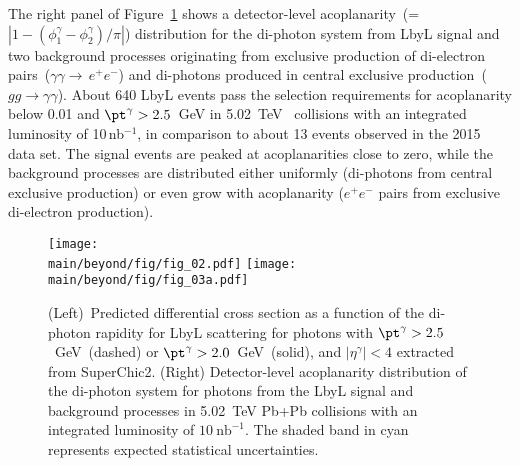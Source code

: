 \documentclass[../report.tex]{subfiles}
\providecommand{\main}{..}
\begin{document}
The right panel of Figure~\ref{fig:lbyl} shows a detector-level  acoplanarity~(=$|1-(\phi^\gamma_1-\phi^\gamma_2)/\pi|$) distribution for the di-photon system from LbyL signal and two background processes originating from exclusive production of di-electron pairs~($\gamma\gamma\rightarrow\,e^+e^-$) and di-photons produced in central exclusive production~($gg\rightarrow \gamma\gamma$). 
About 640 LbyL events pass the selection requirements for acoplanarity below 0.01 and 
$\pt^\gamma>2.5$~GeV in 5.02~TeV \PbPb~collisions with an integrated luminosity of 10\,nb$^{-1}$, 
in comparison to about 13 events observed in the 2015 data set. 
The signal events are peaked at acoplanarities close to zero, while the background processes are distributed either uniformly (di-photons from central exclusive production) or even grow with acoplanarity ($e^+e^-$ pairs from exclusive di-electron production). 

\begin{figure}[!hbt]
\centering
\texttt{[image: \\main/beyond/fig/fig\_02.pdf]}
\texttt{[image: \\main/beyond/fig/fig\_03a.pdf]}
\caption{
(Left)~Predicted differential cross section as a function of the di-photon rapidity for LbyL scattering for photons with
$\pt^\gamma>2.5$~GeV~(dashed) or $\pt^\gamma>2.0$~GeV~(solid), and
$|\eta^\gamma|<4$ extracted from SuperChic2.
(Right) Detector-level acoplanarity distribution of the di-photon system for photons from the LbyL signal and background processes in
  5.02~TeV Pb+Pb collisions with an integrated luminosity of
  $10~\mathrm{nb}^{-1}$. The shaded band in cyan represents expected statistical uncertainties.
}
\label{fig:lbyl}
\end{figure}
\end{document}

